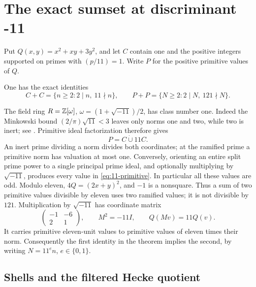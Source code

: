 \section{The exact sumset at discriminant -11}\label{sec:minus11}

Put $Q(x,y)=x^2+xy+3y^2$, and let $C$ contain one and the positive
integers supported on primes with $(p/11)=1$.  Write $P$ for the
positive primitive values of $Q$.

\begin{theorem}\label{thm:minus11}
One has the exact identities
\[
 C+C=\{n\ge2:2\mid n,\ 11\nmid n\},\qquad
 P+P=\{N\ge2:2\mid N,\ 121\nmid N\}.
\]
\end{theorem}

The field ring $R=\mathbb Z[\omega]$, $\omega=(1+\sqrt{-11})/2$, has class
number one.  Indeed the Minkowski bound
$(2/\pi)\sqrt{11}<3$ leaves only norms one and two, while two is
inert; see \cite[Theorem~4.3]{MilneANT}.  Primitive ideal factorization
therefore gives
\begin{equation}\label{eq:11-primitive}
                             P=C\mathbin{\dot\cup}11C.
\end{equation}
An inert prime dividing a norm divides both coordinates; at the
ramified prime a primitive norm has valuation at most one.  Conversely,
orienting an entire split prime power to a single principal prime ideal,
and optionally multiplying by $\sqrt{-11}$, produces every value in
\eqref{eq:11-primitive}.  In particular all these values are odd.
Modulo eleven, $4Q=(2x+y)^2$, and $-1$ is a nonsquare.  Thus a sum
of two primitive values divisible by eleven uses two ramified values;
it is not divisible by $121$.  Multiplication by $\sqrt{-11}$ has
coordinate matrix
\[
 \begin{pmatrix}-1&-6\\2&1\end{pmatrix},\qquad M^2=-11I,
 \qquad Q(Mv)=11Q(v).
\]
It carries primitive eleven-unit values to primitive values of eleven
times their norm.  Consequently the first identity in the theorem
implies the second, by writing $N=11^e n$, $e\in\{0,1\}$.

\subsection{Shells and the filtered Hecke quotient}

